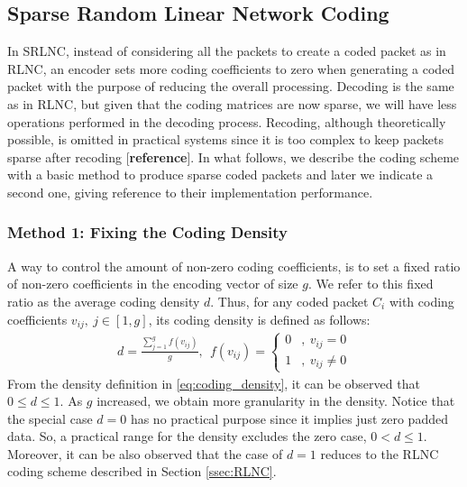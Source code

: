 \subsection{Sparse Random Linear Network Coding}

In \ac{SRLNC}, instead of considering all the packets to create a coded packet
as in \ac{RLNC}, an encoder sets more coding coefficients to zero when
generating a coded packet with the purpose of reducing the overall processing.
Decoding is the same as in \ac{RLNC}, but given that the coding matrices are now
sparse, we will have less operations performed in the decoding process.
Recoding, although theoretically possible, is omitted in practical systems since
it is too complex to keep packets sparse after recoding
[\textbf{reference}]. In what follows, we describe the coding
scheme with a basic method to produce sparse coded packets and later we indicate
a second one, giving reference to their implementation performance.

\subsubsection{Method 1: Fixing the Coding Density}
A way to control the amount of non-zero coding coefficients, is to set a
fixed ratio of non-zero coefficients in the encoding vector of size $g$. We
refer to this fixed ratio as the average coding density $d$. Thus, for any
coded packet $C_i$ with coding coefficients $v_{ij},\ j \in [1,g]$, its
coding density is defined as follows:
%
\begin{align}
\label{eq:coding_density}
d = \frac{\sum_{j=1}^{g} f(v_{ij})}{g},\ \
    f(v_{ij}) =
    \begin{cases}
        0 &,\ v_{ij} = 0 \\
        1 &,\ v_{ij} \neq 0
    \end{cases}
\end{align}
%
From the density definition in \eqref{eq:coding_density}, it can be
observed that $0 \leq d \leq 1$. As $g$ increased, we obtain more
granularity in the density. Notice that the special case $d = 0$ has no
practical purpose since it implies just zero padded data. So, a practical
range for the density excludes the zero case, $0 < d \leq 1$. Moreover,
it can be also observed that the case of $d = 1$ reduces to the \ac{RLNC}
coding scheme described in Section \ref{ssec:RLNC}.

